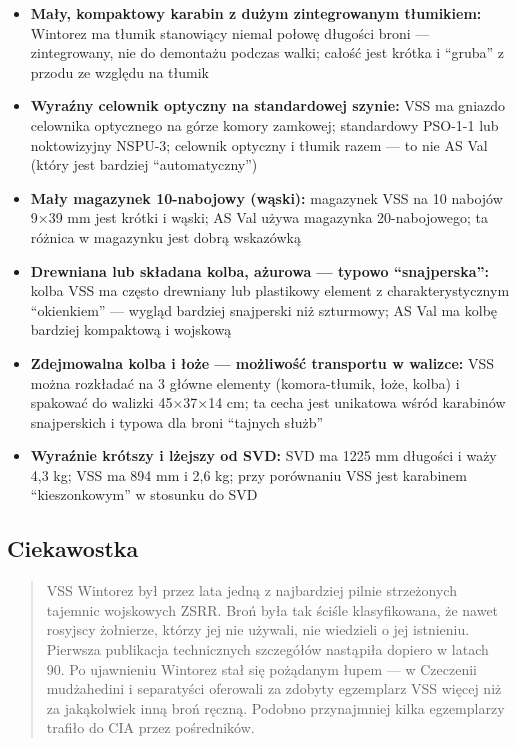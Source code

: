 \documentclass[12pt,oneside]{book}
\providecommand{\tightlist}{%
  \setlength{\itemsep}{0pt}\setlength{\parskip}{0pt}}
\begin{document}
\begin{itemize}
\tightlist
\item
  \textbf{Mały, kompaktowy karabin z dużym zintegrowanym tłumikiem:}
  Wintorez ma tłumik stanowiący niemal połowę długości broni ---
  zintegrowany, nie do demontażu podczas walki; całość jest krótka i
  ``gruba'' z przodu ze względu na tłumik
\item
  \textbf{Wyraźny celownik optyczny na standardowej szynie:} VSS ma
  gniazdo celownika optycznego na górze komory zamkowej; standardowy
  PSO-1-1 lub noktowizyjny NSPU-3; celownik optyczny i tłumik razem ---
  to nie AS Val (który jest bardziej ``automatyczny'')
\item
  \textbf{Mały magazynek 10-nabojowy (wąski):} magazynek VSS na 10
  nabojów 9×39 mm jest krótki i wąski; AS Val używa magazynka
  20-nabojowego; ta różnica w magazynku jest dobrą wskazówką
\item
  \textbf{Drewniana lub składana kolba, ażurowa --- typowo
  ``snajperska'':} kolba VSS ma często drewniany lub plastikowy element
  z charakterystycznym ``okienkiem'' --- wygląd bardziej snajperski niż
  szturmowy; AS Val ma kolbę bardziej kompaktową i wojskową
\item
  \textbf{Zdejmowalna kolba i łoże --- możliwość transportu w walizce:}
  VSS można rozkładać na 3 główne elementy (komora-tłumik, łoże, kolba)
  i spakować do walizki 45×37×14 cm; ta cecha jest unikatowa wśród
  karabinów snajperskich i typowa dla broni ``tajnych służb''
\item
  \textbf{Wyraźnie krótszy i lżejszy od SVD:} SVD ma 1225 mm długości i
  waży 4,3 kg; VSS ma 894 mm i 2,6 kg; przy porównaniu VSS jest
  karabinem ``kieszonkowym'' w stosunku do SVD
\end{itemize}

\subsection{Ciekawostka}\label{ciekawostka-76}

\begin{quote}
VSS Wintorez był przez lata jedną z najbardziej pilnie strzeżonych
tajemnic wojskowych ZSRR. Broń była tak ściśle klasyfikowana, że nawet
rosyjscy żołnierze, którzy jej nie używali, nie wiedzieli o jej
istnieniu. Pierwsza publikacja technicznych szczegółów nastąpiła dopiero
w latach 90. Po ujawnieniu Wintorez stał się pożądanym łupem --- w
Czeczenii mudżahedini i separatyści oferowali za zdobyty egzemplarz VSS
więcej niż za jakąkolwiek inną broń ręczną. Podobno przynajmniej kilka
egzemplarzy trafiło do CIA przez pośredników.
\end{quote}
\end{document}
